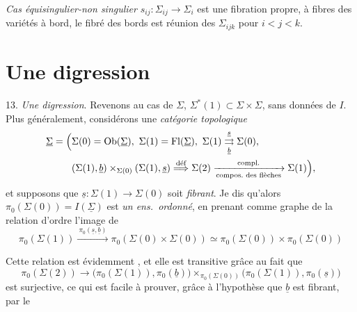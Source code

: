 \documentclass[11pt,a4paper]{article}
\begin{document}

\emph{Cas équisingulier-non singulier} $s_{ij} : \Sigma_{ij}\to\Sigma_i$ est une fibration propre, à fibres des variétés à bord, le fibré des bords est réunion des $\Sigma_{ijk}$ pour $i<j<k$.

\section*{Une digression}

13. \emph{Une digression}. Revenons au cas de $\Sigma$, $\Sigma^{*}(1)\subset\Sigma\times\Sigma$, sans données de $I$. Plus généralement, considérons une \emph{catégorie topologique}
\[
\begin{aligned}
\underline{\Sigma}=\Bigl(&\Sigma(0)=\mathrm{Ob}(\underline{\Sigma}),\ \Sigma(1)=\mathrm{Fl}(\underline{\Sigma}),\ \Sigma(1)\overset{\underline s}{\underset{\underline b}{\rightrightarrows}}\Sigma(0),\\
&(\Sigma(1),\underline b)\times_{\Sigma(0)}(\Sigma(1),\underline s)\overset{\text{déf}}{\Longrightarrow}\Sigma(2)\xrightarrow[\text{compos.\ des flèches}]{\text{compl.}}\Sigma(1)\Bigr),
\end{aligned}
\]
et supposons que $\underline s : \Sigma(1)\to\Sigma(0)$ soit \emph{fibrant}. Je dis qu'alors $\pi_0(\Sigma(0))=I(\underline{\Sigma})$ est \emph{un ens.\ ordonné}, en prenant comme graphe de la relation d'ordre l'image de
\[
\pi_0(\Sigma(1))\xrightarrow{\ \pi_0(\underline s,\underline b)\ }\pi_0(\Sigma(0)\times\Sigma(0))\simeq\pi_0(\Sigma(0))\times\pi_0(\Sigma(0))
\]


 Cette relation est évidemment  , et elle est transitive grâce au fait que
\[
\pi_0(\Sigma(2))\longrightarrow\bigl(\pi_0(\Sigma(1)),\pi_0(\underline b)\bigr)\times_{\pi_0(\Sigma(0))}\bigl(\pi_0(\Sigma(1)),\pi_0(\underline s)\bigr)
\]
est surjective, ce qui est facile à prouver, grâce à l'hypothèse que $\underline b$ est fibrant, par le
\end{document}
